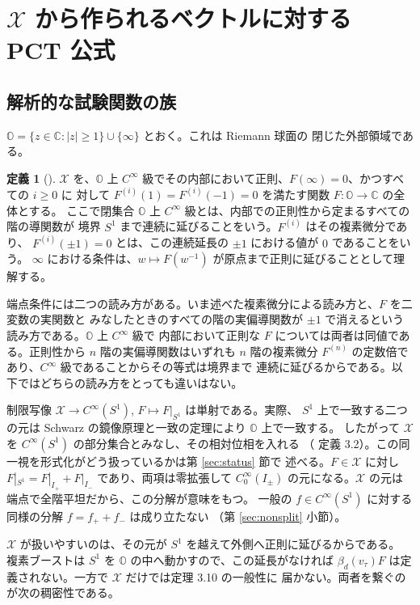 \documentclass[11pt,a4paper]{article}
\newcommand{\Circ}{S^{1}}
\newcommand{\Xcl}{\mathcal{X}}
\newcommand{\Oex}{\mathbb{O}}
\newcommand{\abs}[1]{\lvert #1 \rvert}
\theoremstyle{definition}
\newtheorem{definition}[theorem]{定義}
\newcommand{\srcnum}[1]{\renewcommand{\thetheorem}{#1}}
\begin{document}
\section{\texorpdfstring{$\Xcl$}{X} から作られるベクトルに対する PCT 公式}
\label{sec:core}

\subsection{解析的な試験関数の族}

$\Oex = \{z \in \mathbb{C} : \abs{z} \ge 1\} \cup \{\infty\}$ とおく。これは Riemann 球面の
閉じた外部領域である。

\srcnum{3.2}
\begin{definition}[\cite{T26}]
\label{def:Xcl}
$\Xcl$ を、$\Oex$ 上 $C^\infty$ 級でその内部において正則、$F(\infty) = 0$、かつすべての $i \ge 0$ に
対して $F^{(i)}(1) = F^{(i)}(-1) = 0$ を満たす関数 $F : \Oex \to \mathbb{C}$ の全体とする。
ここで閉集合 $\Oex$ 上 $C^\infty$ 級とは、内部での正則性から定まるすべての階の導関数が
境界 $\Circ$ まで連続に延びることをいう。$F^{(i)}$ はその複素微分であり、
$F^{(i)}(\pm 1) = 0$ とは、この連続延長の $\pm 1$ における値が $0$ であることをいう。
$\infty$ における条件は、$w \mapsto F(w^{-1})$ が原点まで正則に延びることとして理解する。
\end{definition}

端点条件には二つの読み方がある。いま述べた複素微分による読み方と、$F$ を二変数の実関数と
みなしたときのすべての階の実偏導関数が $\pm 1$ で消えるという読み方である。$\Oex$ 上 $C^\infty$ 級で
内部において正則な $F$ については両者は同値である。正則性から $n$ 階の実偏導関数はいずれも
$n$ 階の複素微分 $F^{(n)}$ の定数倍であり、$C^\infty$ 級であることからその等式は境界まで
連続に延びるからである。以下ではどちらの読み方をとっても違いはない。

制限写像 $\Xcl \to C^\infty(\Circ)$, $F \mapsto F|_{\Circ}$ は単射である。実際、
$\Circ$ 上で一致する二つの元は Schwarz の鏡像原理と一致の定理により $\Oex$ 上で一致する。
したがって $\Xcl$ を $C^\infty(\Circ)$ の部分集合とみなし、その相対位相を入れる
（\cite{T26} 定義 3.2）。この同一視を形式化がどう扱っているかは第 \ref{sec:status} 節で
述べる。$F \in \Xcl$ に対し
$F|_{\Circ} = F|_{I_+} + F|_{I_-}$ であり、両項は零拡張して
$C_0^\infty(I_\pm)$ の元になる。$\Xcl$ の元は端点で全階平坦だから、この分解が意味をもつ。
一般の $f \in C^\infty(\Circ)$ に対する同様の分解 $f = f_+ + f_-$ は成り立たない
（第 \ref{sec:nonsplit} 小節）。

$\Xcl$ が扱いやすいのは、その元が $\Circ$ を越えて外側へ正則に延びるからである。
複素ブーストは $\Circ$ を $\Oex$ の中へ動かすので、この延長がなければ
$\beta_d(v_\tau)F$ は定義されない。一方で $\Xcl$ だけでは定理 3.10 の一般性に
届かない。両者を繋ぐのが次の稠密性である。
\end{document}
